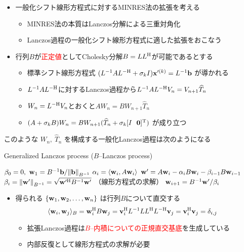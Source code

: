 
\begin{itemize}
	\item 一般化シフト線形方程式に対するMINRES法の拡張を考える
		\begin{itemize}
			\item MINRES法の本質はLanczos分解による三重対角化
			\item Lanczos過程の一般化シフト線形方程式に適した拡張をおこなう
		\end{itemize}
	\item 行列$B$が\textcolor{red}{正定値}としてCholesky分解$B=LL^{\mathrm{H}}$が可能であるとする
		\begin{itemize}
			\item 標準シフト線形方程式 $(L^{-1}AL^{-\mathrm{H}} + \sigma_{k}I)\vb{x}'^{(k)} = L^{-1}\vb{b}$ が導かれる
			\item $L^{-1}AL^{-\mathrm{H}}$に対するLanczos過程から$L^{-1}AL^{-\mathrm{H}}V_{n} = V_{n+1}\widehat{T}_{n}$
			\item $W_{n} = L^{-\mathrm{H}}V_{n}$とおくと$AW_{n}=BW_{n+1}\widehat{T}_{n}$
			\item $(A+\sigma_{k}B)W_{n}=BW_{n+1}(\widehat{T}_{n} + \sigma_{k}[I \ \  \vb{0}]^{\mathrm{T}})$ が成り立つ
		\end{itemize}
\end{itemize}
このような $W_{n},\ \widehat{T}_{n}$ を構成する一般化Lanczos過程は次のようになる
\begin{algorithm}[H]
   \caption{ Generalized Lanczos process ($B$--Lanczos process)}
   \label{alg-ex-lanczos}
   \begin{algorithmic}[1]
   	\vspace{-0.4\baselineskip}
   	\State $\beta_0 = 0,\ \vb{w}_1 = B^{-1}\vb{b} / \norm{\vb{b}}_{B^{-1}}$
   		\State $\alpha_i = \langle \vb{w}_i, A\vb{w}_i \rangle$
   		\State $\vb{w}' = A\vb{w}_i - \alpha_i B\vb{w}_i - \beta_{i-1} B \vb{w}_{i-1}$
   		\State $\beta_i = \norm{\vb{w}'}_{B^{-1}} = \sqrt{\vb{w}'^{\mathrm{H}} B^{-1} \vb{w}'}$ （線形方程式の求解）
   		\State $\vb{w}_{i+1} = B^{-1}\vb{w}' / \beta_i$
   	\EndFor
   \end{algorithmic}
\end{algorithm}
\vspace{-10pt}
\begin{itemize}
	\item 得られる $\{ \vb{w}_{1}, \vb{w}_{2}, \dots, \vb{w}_{n} \}$ は行列$B$について直交する
	\begin{align}
		\langle \vb{w}_{i}, \vb{w}_{j} \rangle_{B} = \vb{w}_{i}^{\mathrm{H}} B \vb{w}_{j} = \vb{v}_{i}^{\mathrm{H}} L^{-1} LL^{\mathrm{H}} L^{-\mathrm{H}} \vb{v}_{j} = \vb{v}_{i}^{\mathrm{H}} \vb{v}_{j} = \delta_{i,j}
	\end{align}
	\vspace{-0.9\baselineskip}
	\begin{itemize}
		\item 拡張Lanczos過程は\textcolor{red}{$B$--内積についての正規直交基底}を生成している
		\item 内部反復として線形方程式の求解が必要
	\end{itemize}
\end{itemize}



